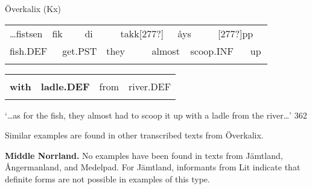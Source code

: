 \begin{listWWNumileveli}
\item {}

\begin{styleExample}
Överkalix (Kx)

\end{styleExample}

\end{listWWNumileveli}

\begin{tabular}{llllllllllll}
\lsptoprule
…fistsen & \multicolumn{2}{l}{fik

} & \multicolumn{2}{l}{di

} & \multicolumn{2}{l}{takk[277?]

} & \multicolumn{2}{l}{åys

} & \multicolumn{2}{l}{[277?]pp

} & \\
\multicolumn{2}{l}{fish.DEF

} & \multicolumn{2}{l}{get.PST

} & \multicolumn{2}{l}{they

} & \multicolumn{2}{l}{almost

} & \multicolumn{2}{l}{scoop.INF

} & \multicolumn{2}{l}{up

}\\
\lspbottomrule
\end{tabular}

\begin{tabular}{llll}
\lsptoprule
\multicolumn{4}{l}{{\bfseries ve}

}\\
{\bfseries with} & {\bfseries ladle.DEF} & from & river.DEF\\
\lspbottomrule
\end{tabular}

\begin{styleTranslation}
‘…as for the fish, they almost had to scoop it up with a ladle from the river…’ 362

\end{styleTranslation}

\begin{styleBodyTextFirst}
Similar examples are found in other transcribed texts from Överkalix. 

\end{styleBodyTextFirst}

\begin{styleBodytextC}
\textbf{Middle Norrland.} No examples have been found in texts from Jämtland, Ångermanland, and Medelpad. For Jämtland, informants from Lit indicate that definite forms are not possible in examples of this type.

\end{styleBodytextC}

